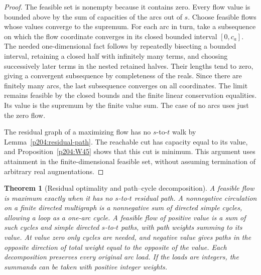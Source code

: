 \documentclass[11pt,oneside,openany]{book}
\theoremstyle{plain}
\newtheorem{theorem}{Theorem}[chapter]
\theoremstyle{definition}
\theoremstyle{remark}
\begin{document}
\begin{proof}
The feasible set is nonempty because it contains zero. Every flow
value is bounded above by the sum of capacities of the arcs out of
\(s\). Choose feasible flows whose values converge to the supremum.
For each arc in turn, take a subsequence on which the flow coordinate
converges in its closed bounded interval \([0,c_a]\). The needed
one-dimensional fact follows by repeatedly bisecting a bounded
interval, retaining a closed half with infinitely many terms, and
choosing successively later terms in the nested retained halves.
Their lengths tend to zero, giving a convergent subsequence by
completeness of the reals. Since there are finitely many arcs, the
last subsequence converges on all coordinates. The limit remains
feasible by the closed bounds and the finite linear conservation
equalities. Its value is the supremum by the finite value sum.
The case of no arcs uses just the zero flow.

The residual graph of a maximizing flow has no \(s\)-to-\(t\)
walk by Lemma~\ref{p204:residual-path}. The reachable cut has capacity
equal to its value, and Proposition~\ref{p204:W45} shows that this cut
is minimum. This argument uses attainment in the finite-dimensional
feasible set, without assuming termination of arbitrary real
augmentations.
\end{proof}

\begin{theorem}[Residual optimality and path--cycle decomposition]
\label{p204:W47}
A feasible flow is maximum exactly when it has no \(s\)-to-\(t\)
residual path. A nonnegative circulation on a finite directed
multigraph is a nonnegative sum of directed simple cycles, allowing
a loop as a one-arc cycle. A feasible flow of positive value is
a sum of such cycles and simple directed \(s\)-to-\(t\) paths, with
path weights summing to its value. At value zero only cycles are
needed, and negative value gives paths in the opposite direction
of total weight equal to the opposite of the value. Each decomposition
preserves every original arc load. If the loads are integers, the
summands can be taken with positive integer weights.
\end{theorem}
\end{document}
